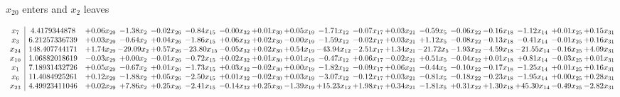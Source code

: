 \documentclass[9pt]{article}
\begin{document}
 $ x_{20} $ enters and $ x_{2} $ leaves 

 \[\begin{array}{c| c c@{\hskip 2pt} c@{\hskip 2pt} c@{\hskip 2pt} c@{\hskip 2pt} c@{\hskip 2pt} c@{\hskip 2pt} c@{\hskip 2pt} c@{\hskip 2pt} c@{\hskip 2pt} c@{\hskip 2pt} c@{\hskip 2pt} c@{\hskip 2pt} c@{\hskip 2pt} c@{\hskip 2pt} c@{\hskip 2pt} c@{\hskip 2pt} }
 x_{7}   &  4.4179344878 & +  0.06 x_{29} & -1.38 x_{2} & -0.02 x_{26} & -0.84 x_{15} & -0.00 x_{32} & +  0.01 x_{30} & +  0.05 x_{19} & -1.71 x_{12} & -0.07 x_{17} & +  0.03 x_{21} & -0.59 x_{5} & -0.06 x_{22} & -0.16 x_{18} & -1.12 x_{14} & +  0.01 x_{25} & +  0.15 x_{31}\\
 x_{3}   &  6.21257336739 & +  0.03 x_{29} & -0.64 x_{2} & +  0.04 x_{26} & -1.86 x_{15} & +  0.06 x_{32} & +  0.02 x_{30} & -0.00 x_{19} & -1.59 x_{12} & -0.02 x_{17} & +  0.03 x_{21} & +  1.12 x_{5} & -0.08 x_{22} & -0.13 x_{18} & -0.41 x_{14} & -0.01 x_{25} & +  0.16 x_{31}\\
 x_{24}   &  148.407744171 & +  1.74 x_{29} & -29.09 x_{2} & +  0.57 x_{26} & -23.80 x_{15} & -0.05 x_{32} & +  0.02 x_{30} & +  0.54 x_{19} & -43.94 x_{12} & -2.51 x_{17} & +  1.34 x_{21} & -21.72 x_{5} & -1.93 x_{22} & -4.59 x_{18} & -21.55 x_{14} & -0.16 x_{25} & +  4.09 x_{31}\\
 x_{10}   &  1.06882018619 & -0.03 x_{29} & +  0.00 x_{2} & -0.01 x_{26} & -0.72 x_{15} & +  0.02 x_{32} & +  0.01 x_{30} & +  0.01 x_{19} & -0.47 x_{12} & +  0.06 x_{17} & -0.02 x_{21} & +  0.51 x_{5} & -0.04 x_{22} & +  0.01 x_{18} & +  0.81 x_{14} & -0.03 x_{25} & +  0.01 x_{31}\\
 x_{1}   &  7.18931432726 & +  0.05 x_{29} & -0.67 x_{2} & +  0.01 x_{26} & -1.73 x_{15} & +  0.03 x_{32} & -0.02 x_{30} & +  0.00 x_{19} & -1.82 x_{12} & -0.09 x_{17} & +  0.06 x_{21} & -0.44 x_{5} & -0.10 x_{22} & -0.17 x_{18} & -1.25 x_{14} & +  0.01 x_{25} & +  0.16 x_{31}\\
 x_{6}   &  11.4084925261 & +  0.12 x_{29} & -1.88 x_{2} & +  0.05 x_{26} & -2.50 x_{15} & +  0.01 x_{32} & -0.02 x_{30} & +  0.03 x_{19} & -3.07 x_{12} & -0.12 x_{17} & +  0.03 x_{21} & -0.81 x_{5} & -0.18 x_{22} & -0.23 x_{18} & -1.95 x_{14} & +  0.00 x_{25} & +  0.28 x_{31}\\
 x_{23}   &  4.49923411046 & +  0.02 x_{29} & +  7.86 x_{2} & +  0.25 x_{26} & -2.41 x_{15} & -0.14 x_{32} & +  0.25 x_{30} & -1.39 x_{19} & + 15.23 x_{12} & +  1.98 x_{17} & +  0.34 x_{21} & -1.81 x_{5} & +  0.31 x_{22} & +  1.30 x_{18} & + 45.30 x_{14} & -0.49 x_{25} & -2.82 x_{31}\\

\end{array}\]
\end{document}

